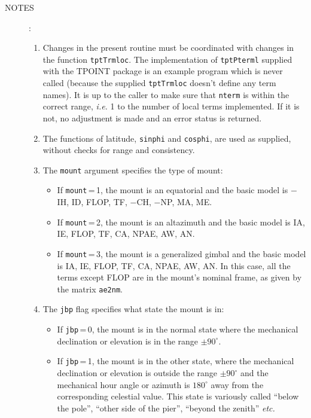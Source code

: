 \documentclass[12pt,fleqn,twoside]{article}
\renewcommand{\_}{{\tt\char'137}}     %
\newcommand{\notes}[1]
{
  \goodbreak
  \begin{description}
    \item[NOTES]: \nopagebreak
        #1
  \end{description}
  \vspace{-3ex}
}
\begin{document}
\notes{
\begin{enumerate}
\setlength{\parskip}{\medskipamount}
\item Changes in the present routine must be coordinated with changes
      in the function {\tt tptTrmloc}.  The implementation of {\tt tptPterml}
      supplied with the TPOINT package is an example program which
      is never called (because the supplied {\tt tptTrmloc} doesn't
      define any term names).
      It is up to the caller to make sure that {\tt nterm} is within the
      correct range, {\it i.e.}\/ 1 to the number of local terms
      implemented.  If it is not, no adjustment is made
      and an error status is returned.
\item The functions of latitude, {\tt sinphi} and {\tt cosphi}, are used as
      supplied, without checks for range and consistency.
\item The {\tt mount} argument specifies the type of mount:
      \begin{itemize}
      \item If {\tt mount}\,=\,1, the mount is an equatorial and the
            basic model is $-$IH, ID, FLOP, TF, $-$CH, $-$NP, MA, ME.
      \item If {\tt mount}\,=\,2, the mount is an altazimuth and the
            basic model is IA, IE, FLOP, TF, CA, NPAE, AW, AN.
      \item If {\tt mount}\,=\,3, the mount is a generalized gimbal
            and the basic model is
            IA, IE, FLOP, TF, CA, NPAE, AW, AN.  In this case, all
            the terms except FLOP are in the mount's nominal frame,
            as given by the matrix {\tt ae2nm}.
      \end{itemize}
\item The {\tt jbp} flag specifies what state the mount is in:
      \begin{itemize}
      \item If {\tt jbp}\,=\,0, the mount is in the normal state
            where the mechanical declination or elevation is in the
            range $\pm90^\circ$.
      \item If {\tt jbp}\,=\,1, the mount is in the other state,
            where the mechanical
            declination or elevation is outside the range $\pm90^\circ$
            and the mechanical hour angle or azimuth is $180^\circ$
            away from the corresponding celestial value.  This state is
            variously called ``below the pole'', ``other side of the pier'',
            ``beyond the zenith'' {\it etc.}

\end{itemize}
\end{enumerate}}
\end{document}
